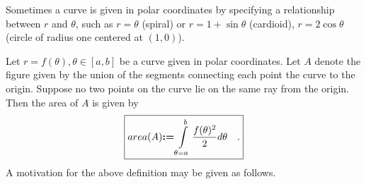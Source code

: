 \documentclass[12pt]{book}
\newcommand{\eqdef}{\textbf{:=}}
\renewcommand{\optionalDisplay}[1]{}
\begin{document}
 Sometimes a curve is given in polar coordinates by specifying a relationship between $r$ and $\theta$, such as $r=\theta$ (spiral) or $r=1+\sin \theta$ (cardioid), $r=2\cos \theta$ (circle of radius one centered at $(1,0)$).

\optionalDisplay{
\psset{xunit=1cm,yunit=1cm}
\begin{pspicture*}(-5,-5)(5,5)
\rput (3,3){$r=\theta$}
\psaxes[labels=none, ticks=x]{<->}(0,0)(-4.5,-4.5)(4.5,4.5)
\parametricplot[linecolor=red, plotpoints=500]{0}{720}{t cos t mul 180 div t sin t mul 180 div }
\end{pspicture*}

\psset{xunit=1cm,yunit=1cm}
\begin{pspicture*}(-5,-5)(5,5)
\rput (3,3){$r=1+\sin\theta$}
\psaxes[labels=none, ticks=x]{<->}(0,0)(-4.5,-4.5)(4.5,4.5)
\parametricplot[linecolor=red, plotpoints=500]{0}{360}{1 t sin add t cos mul
 1 t sin add t sin mul}
\end{pspicture*}

\psset{xunit=1cm,yunit=1cm}
\begin{pspicture*}(-5,-5)(5,5)
\rput (3,3){$r=2\cos\theta$}
\psaxes[labels=none, ticks=x]{<->}(0,0)(-4.5,-4.5)(4.5,4.5)
\parametricplot[linecolor=red, plotpoints=500]{0}{360}
{ t cos 2 mul t cos mul
  t cos 2 mul t sin mul}
\end{pspicture*}
} %

 Let $r=f(\theta), \theta\in [a,b]$ be a curve given in polar coordinates.  Let $A$ denote the figure given by the union of the segments connecting each point the curve to the origin. Suppose no two points on the curve lie on the same ray from the origin. Then the area of $A$ is given by
\begin{equation}\boxed{\label{eqAreaUnderPolarCurve}
area(A)\eqdef \int\limits_{\theta=a}^b \frac{f(\theta)^2}{2}d\theta\quad .
}
\end{equation}
A motivation for the above definition may be given as follows.
\end{document}
